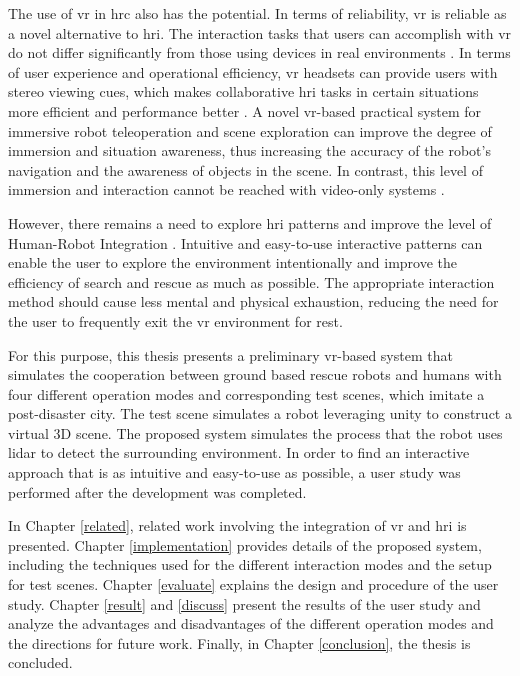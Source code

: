 The use of \gls{vr} in \gls{hrc} also has the potential. In terms of reliability, \gls{vr} is reliable as a novel alternative to \gls{hri}. The interaction tasks that users can accomplish with \gls{vr} do not differ significantly from those using devices in real environments \cite{Villani:2018ub}. In terms of user experience and operational efficiency, \gls{vr} headsets can provide users with stereo viewing cues, which makes collaborative \gls{hri} tasks in certain situations more efficient and performance better \cite{Liu:2017tw}. A novel \gls{vr}-based practical system for immersive robot teleoperation and scene exploration can improve the degree of immersion and situation awareness, thus increasing the accuracy of the robot's navigation and the awareness of objects in the scene. In contrast, this level of immersion and interaction cannot be reached with video-only systems \cite{Stotko:2019ud}.

However, there remains a need to explore \gls{hri} patterns and improve the level of Human-Robot Integration \cite{Wang:2017uy}. Intuitive and easy-to-use interactive patterns can enable the user to explore the environment intentionally and improve the efficiency of search and rescue as much as possible. The appropriate interaction method should cause less mental and physical exhaustion, reducing the need for the user to frequently exit the \gls{vr} environment for rest.

For this purpose, this thesis presents a preliminary \gls{vr}-based system that simulates the cooperation between ground based rescue robots and humans with four different operation modes and corresponding test scenes, which imitate a post-disaster city. The test scene simulates a robot leveraging \gls{unity} to construct a virtual 3D scene. The proposed system simulates the process that the robot uses \gls{lidar} to detect the surrounding environment. In order to find an interactive approach that is as intuitive and easy-to-use as possible, a user study was performed after the development was completed.


In Chapter \ref{related}, related work involving the integration of \gls{vr} and \gls{hri} is presented.
Chapter \ref{implementation} provides details of the proposed system, including the techniques used for the different interaction modes and the setup for test scenes.
Chapter \ref{evaluate} explains the design and procedure of the user study.
Chapter \ref{result} and \ref{discuss} present the results of the user study and analyze the advantages and disadvantages of the different operation modes and the directions for future work.
Finally, in Chapter \ref{conclusion}, the thesis is concluded.


